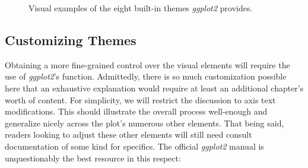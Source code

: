 \begin{figure}[h]
\centering
{}
\caption{Visual examples of the eight built-in themes \textit{ggplot2} provides.}
\label{fig:gg_built-in-themes}
\end{figure}

\vspace{1em}

\subsection{Customizing Themes}

Obtaining a more fine-grained control over the visual elements will require the use of \textit{ggplot2}'s  function. Admittedly, there is so much customization possible here that an exhaustive explanation would require at least an additional chapter's worth of content. For simplicity, we will restrict the discussion to axis text modifications. This should illustrate the overall process well-enough and generalize nicely across the plot's numerous other elements. That being said, readers looking to adjust these other elements will still need consult documentation of some kind for specifics. The official \textit{ggplot2} manual is unquestionably the best resource in this respect:

